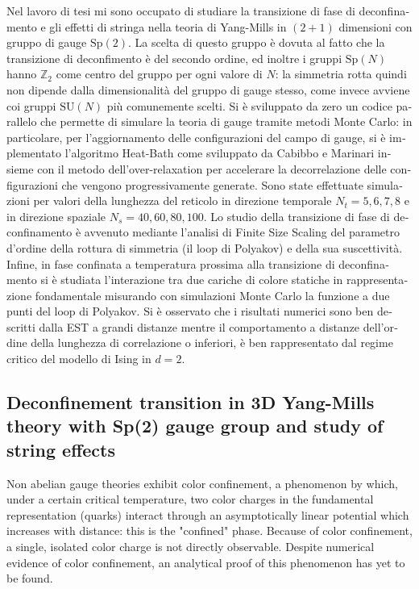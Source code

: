 \documentclass[reqno,11pt]{article}
\numberwithin{equation}{section}
\newcommand{\SU}{\mathrm{SU}}
\newcommand{\Sp}{\mathrm{Sp}}
\begin{document}
\begin{otherlanguage}{italian}
Nel lavoro di tesi mi sono occupato di studiare la transizione di fase di deconfinamento e gli effetti di stringa nella teoria 
di Yang-Mills in $(2+1)$ dimensioni con gruppo di gauge $\Sp(2)$. La scelta di questo gruppo è dovuta al fatto che la transizione 
di deconfimento è del secondo ordine, ed inoltre i gruppi $\Sp(N)$ hanno $\mathbb{Z}_2$ come centro del gruppo per ogni valore di 
$N$: la simmetria rotta quindi non dipende dalla dimensionalità del gruppo di gauge stesso, come invece avviene coi gruppi 
$\SU(N)$ più comunemente scelti. Si è sviluppato da zero un codice parallelo che permette di simulare la teoria di gauge tramite
metodi Monte Carlo: in particolare, per l’aggiornamento delle configurazioni del campo di gauge, si è implementato l’algoritmo 
Heat-Bath come sviluppato da Cabibbo e Marinari insieme con il metodo dell’over-relaxation per accelerare la decorrelazione 
delle configurazioni che vengono progressivamente generate. Sono state effettuate simulazioni per valori della lunghezza del 
reticolo in direzione temporale $N_t = 5, 6, 7, 8$ e in direzione spaziale $N_s = 40, 60, 80, 100$. Lo studio della transizione di 
fase di deconfinamento è avvenuto mediante l’analisi di Finite Size Scaling del parametro d’ordine della rottura di simmetria 
(il loop di Polyakov) e della sua suscettività. 
Infine, in fase confinata a temperatura prossima alla transizione di deconfinamento si è studiata l’interazione tra due cariche 
di colore statiche in rappresentazione fondamentale misurando con simulazioni Monte Carlo la funzione a due punti 
del loop di Polyakov. Si è osservato che i risultati numerici sono ben descritti dalla EST a grandi distanze mentre il 
comportamento a distanze dell’ordine della lunghezza di correlazione o inferiori, è ben rappresentato dal regime critico del 
modello di Ising in $d = 2$. 

\end{otherlanguage}
\subsection*{Deconfinement transition in 3D Yang-Mills theory with Sp(2) gauge group and study of string effects}

Non abelian gauge theories exhibit color confinement, a phenomenon by which, under a certain critical temperature,
two color charges in the fundamental representation (quarks) interact through an asymptotically linear potential which
increases with distance: this is the "confined" phase. Because of color confinement, a single, isolated color charge
is not directly observable. Despite numerical evidence of color confinement, an analytical proof of this phenomenon has
yet to be found. 
\end{document}
